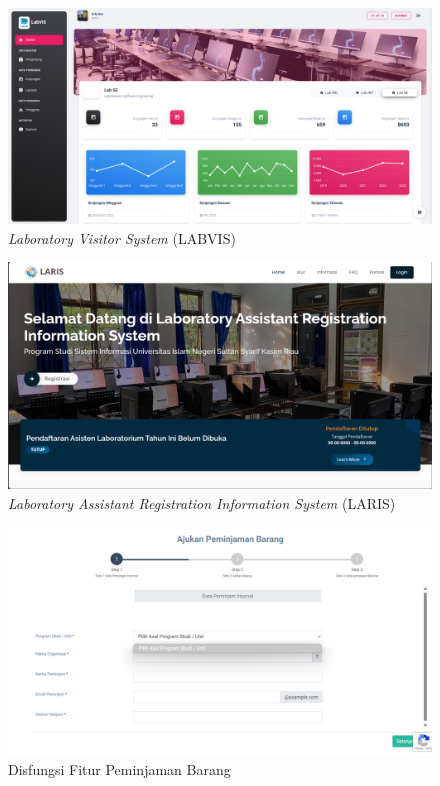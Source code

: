 \begin{figure}
	\centering
	\includegraphics[width=0.82\linewidth]{konten//gambar/labvis.png}
	\caption{\textit{Laboratory Visitor System} (LABVIS)}
	\label{fig:enter-label}
\end{figure}

\begin{figure}
	\centering
	\includegraphics[width=0.82\linewidth]{konten//gambar/laris.png}
	\caption{\textit{Laboratory Assistant Registration Information System} (LARIS)}
	\label{fig:enter-label}
\end{figure}

\begin{figure}
	\centering
	\includegraphics[width=0.82\linewidth]{konten//gambar/observasi-peminjaman-barang.png}
	\caption{Disfungsi Fitur Peminjaman Barang}
	\label{fig:enter-label}
\end{figure}

